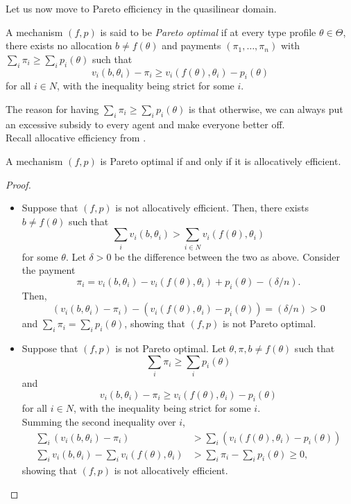 		Let us now move to Pareto efficiency in the quasilinear domain.

		\begin{fdef}
			A mechanism $(f,p)$ is said to be \emph{Pareto optimal} if at every type profile $\theta \in \Theta$, there exists no allocation $b \ne f(\theta)$ and payments $(\pi_1,\ldots,\pi_n)$ with $\sum_i \pi_i \ge \sum_i p_i(\theta)$ such that
			\[ v_i(b,\theta_i) - \pi_i \ge v_i(f(\theta),\theta_i) - p_i(\theta) \]
			for all $i \in N$, with the inequality being strict for some $i$.
		\end{fdef}

		The reason for having $\sum_i \pi_i \ge \sum_i p_i(\theta)$ is that otherwise, we can always put an excessive subsidy to every agent and make everyone better off.\\
		Recall allocative efficiency from .

		\begin{ftheo}
			A mechanism $(f,p)$ is Pareto optimal if and only if it is allocatively efficient.
		\end{ftheo}
		\begin{proof}
			\phantom{pain}
			\begin{itemize}
				\item Suppose that $(f,p)$ is not allocatively efficient. Then, there exists $b \ne f(\theta)$ such that
				\[ \sum_i v_i(b,\theta_i) > \sum_{i \in N} v_i(f(\theta),\theta_i) \]
				for some $\theta$. Let $\delta > 0$ be the difference between the two as above. Consider the payment
				\[ \pi_i = v_i(b,\theta_i) - v_i(f(\theta),\theta_i) + p_i(\theta) - (\delta/n). \]
				Then,
				\[ \left( v_i(b,\theta_i) - \pi_i \right) - \left(v_i(f(\theta),\theta_i) - p_i(\theta)\right) = (\delta/n) > 0 \]
				and $\sum_i \pi_i = \sum_i p_i(\theta)$, showing that $(f,p)$ is not Pareto optimal.

				\item Suppose that $(f,p)$ is not Pareto optimal. Let $\theta,\pi,b \ne f(\theta)$ such that
				\[ \sum_i \pi_i \ge \sum_i p_i(\theta) \]
				and
				\[ v_i(b,\theta_i) - \pi_i \ge v_i(f(\theta),\theta_i) - p_i(\theta) \]
				for all $i \in N$, with the inequality being strict for some $i$.\\
				Summing the second inequality over $i$,
				\begin{align*}
					\sum_i (v_i(b,\theta_i) - \pi_i) &> \sum_i (v_i(f(\theta),\theta_i) - p_i(\theta)) \\
					\sum_i v_i(b,\theta_i) - \sum_i v_i(f(\theta),\theta_i) &> \sum_i \pi_i - \sum_i p_i(\theta) \ge 0,  
				\end{align*}
				showing that $(f,p)$ is not allocatively efficient.
			\end{itemize}
		\end{proof}

